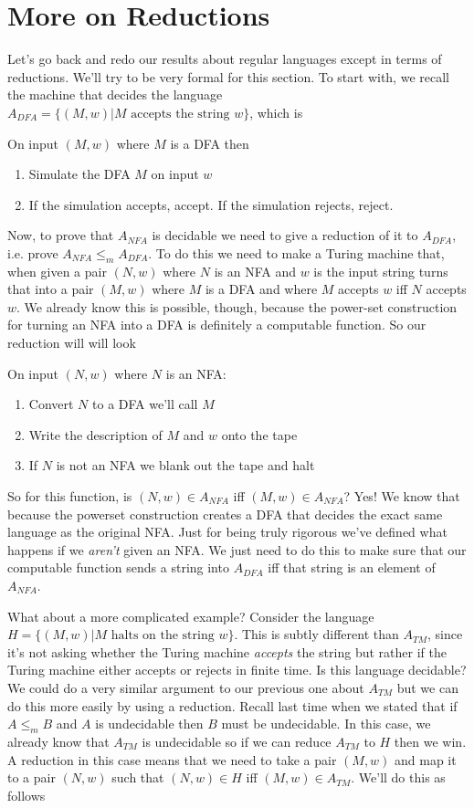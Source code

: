 \documentclass[11pt]{article}
\begin{document}
\section{More on Reductions}
\label{sec-16}
Let's go back and redo our results about regular languages except in terms of reductions. We'll try to be very formal for this section. To start with, we recall the machine that decides the language $A_{DFA} = \{(M,w) | M \text{ accepts the string } w\}$, which is 

On input $(M,w)$ where $M$ is a DFA then 
\begin{enumerate}
\item Simulate the DFA $M$ on input $w$
\item If the simulation accepts, accept. If the simulation rejects, reject.
\end{enumerate}

Now, to prove that $A_{NFA}$ is decidable we need to give a reduction of it to $A_{DFA}$, i.e. prove $A_{NFA} \le_m A_{DFA}$. To do this we need to make a Turing machine that, when given a pair $(N,w)$ where $N$ is an NFA and $w$ is the input string turns that into a pair $(M,w)$ where $M$ is a DFA and where $M$ accepts $w$ iff $N$ accepts $w$. We already know this is possible, though, because the power-set construction for turning an NFA into a DFA is definitely a computable function. So our reduction will will look 

On input $(N,w)$ where $N$ is an NFA:
\begin{enumerate}
\item Convert $N$ to a DFA we'll call $M$
\item Write the description of $M$ and $w$ onto the tape
\item If $N$ is not an NFA we blank out the tape and halt
\end{enumerate}

So for this function, is $(N,w) \in A_{NFA}$ iff $(M,w) \in A_{NFA}$? Yes! We know that because the powerset construction creates a DFA that decides the exact same language as the original NFA. Just for being truly rigorous we've defined what happens if we \emph{aren't} given an NFA. We just need to do this to make sure that our computable function sends a string into $A_{DFA}$ iff that string is an element of $A_{NFA}$.

What about a more complicated example? Consider the language $H = \{(M,w) | M \text{ halts on the string } w\}$. This is subtly different than $A_{TM}$, since it's not asking whether the Turing machine \emph{accepts} the string but rather if the Turing machine either accepts or rejects in finite time. Is this language decidable? We could do a very similar argument to our previous one about $A_{TM}$ but we can do this more easily by using a reduction. Recall last time when we stated that if $A \le_m B$ and $A$ is undecidable then $B$ must be undecidable. In this case, we already know that $A_{TM}$ is undecidable so if we can reduce $A_{TM}$ to $H$ then we win. A reduction in this case means that we need to take a pair $(M,w)$ and map it to a pair $(N,w)$ such that $(N,w) \in H$ iff $(M,w) \in A_{TM}$. We'll do this as follows
\end{document}
